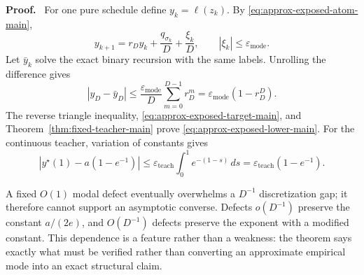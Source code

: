 \documentclass[twoside,11pt]{article}
\renewenvironment{proof}[1][Proof]{\par\noindent\textbf{#1.}\ }{\hfill\BlackBox\par\medskip}
\newcommand{\abs}[1]{\left\lvert #1\right\rvert}
\begin{document}
\begin{proof}
For one pure schedule define $y_k=\ell(z_k)$.  By \eqref{eq:approx-exposed-atom-main},
\begin{equation}
 y_{k+1}=r_Dy_k+\frac{q_{\sigma_k}}D+\frac{\xi_k}D,
 \qquad \abs{\xi_k}\le\varepsilon_{\mathrm{mode}}.
 \label{eq:approx-mode-recursion-main}
\end{equation}
Let $\bar y_k$ solve the exact binary recursion with the same labels.  Unrolling the difference gives
\begin{equation}
 \abs{y_D-\bar y_D}
 \le\frac{\varepsilon_{\mathrm{mode}}}{D}
       \sum_{m=0}^{D-1}r_D^m
 =\varepsilon_{\mathrm{mode}}(1-r_D^D).
 \label{eq:approx-mode-deviation-main}
\end{equation}
The reverse triangle inequality, \eqref{eq:approx-exposed-target-main}, and Theorem~\ref{thm:fixed-teacher-main} prove \eqref{eq:approx-exposed-lower-main}.  For the continuous teacher, variation of constants gives
\begin{equation}
 \abs{y^\star(1)-a(1-e^{-1})}
 \le\varepsilon_{\mathrm{teach}}
     \int_0^1e^{-(1-s)}\,ds
 =\varepsilon_{\mathrm{teach}}(1-e^{-1}).
 \label{eq:teacher-defect-main}
\end{equation}
\end{proof}

A fixed $O(1)$ modal defect eventually overwhelms a $D^{-1}$ discretization gap; it therefore cannot support an asymptotic converse.  Defects $o(D^{-1})$ preserve the constant $a/(2e)$, and $O(D^{-1})$ defects preserve the exponent with a modified constant.  This dependence is a feature rather than a weakness: the theorem says exactly what must be verified rather than converting an approximate empirical mode into an exact structural claim.

\end{document}

